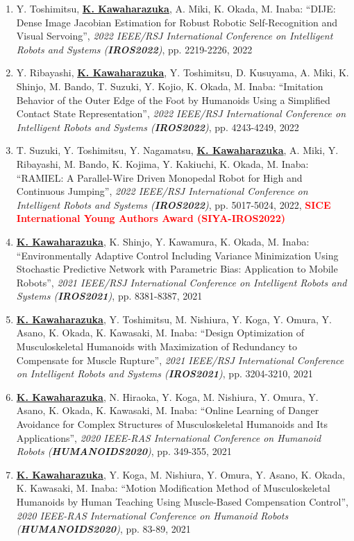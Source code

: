 \documentclass[letterpaper]{article}
\begin{document}
\begin{enumerate}
\item Y. Toshimitsu, \underline{\textbf{K. Kawaharazuka}}, A. Miki, K. Okada, M. Inaba: ``DIJE: Dense Image Jacobian Estimation for Robust Robotic Self-Recognition and Visual Servoing'', \textit{2022 IEEE/RSJ International Conference on Intelligent Robots and Systems (\textit{\textbf{IROS2022}})}, pp. 2219-2226, 2022
\item Y. Ribayashi, \underline{\textbf{K. Kawaharazuka}}, Y. Toshimitsu, D. Kusuyama, A. Miki, K. Shinjo, M. Bando, T. Suzuki, Y. Kojio, K. Okada, M. Inaba: ``Imitation Behavior of the Outer Edge of the Foot by Humanoids Using a Simplified Contact State Representation'', \textit{2022 IEEE/RSJ International Conference on Intelligent Robots and Systems (\textit{\textbf{IROS2022}})}, pp. 4243-4249, 2022
\item T. Suzuki, Y. Toshimitsu, Y. Nagamatsu, \underline{\textbf{K. Kawaharazuka}}, A. Miki, Y. Ribayashi, M. Bando, K. Kojima, Y. Kakiuchi, K. Okada, M. Inaba: ``RAMIEL: A Parallel-Wire Driven Monopedal Robot for High and Continuous Jumping'', \textit{2022 IEEE/RSJ International Conference on Intelligent Robots and Systems (\textit{\textbf{IROS2022}})}, pp. 5017-5024, 2022, \textbf{\textcolor{red}{SICE International Young Authors Award (SIYA-IROS2022)}}
\item \underline{\textbf{K. Kawaharazuka}}, K. Shinjo, Y. Kawamura, K. Okada, M. Inaba: ``Environmentally Adaptive Control Including Variance Minimization Using Stochastic Predictive Network with Parametric Bias: Application to Mobile Robots'', \textit{2021 IEEE/RSJ International Conference on Intelligent Robots and Systems (\textit{\textbf{IROS2021}})}, pp. 8381-8387, 2021
\item \underline{\textbf{K. Kawaharazuka}}, Y. Toshimitsu, M. Nishiura, Y. Koga, Y. Omura, Y. Asano, K. Okada, K. Kawasaki, M. Inaba: ``Design Optimization of Musculoskeletal Humanoids with Maximization of Redundancy to Compensate for Muscle Rupture'', \textit{2021 IEEE/RSJ International Conference on Intelligent Robots and Systems (\textit{\textbf{IROS2021}})}, pp. 3204-3210, 2021
\item \underline{\textbf{K. Kawaharazuka}}, N. Hiraoka, Y. Koga, M. Nishiura, Y. Omura, Y. Asano, K. Okada, K. Kawasaki, M. Inaba: ``Online Learning of Danger Avoidance for Complex Structures of Musculoskeletal Humanoids and Its Applications'', \textit{2020 IEEE-RAS International Conference on Humanoid Robots (\textit{\textbf{HUMANOIDS2020}})}, pp. 349-355, 2021
\item \underline{\textbf{K. Kawaharazuka}}, Y. Koga, M. Nishiura, Y. Omura, Y. Asano, K. Okada, K. Kawasaki, M. Inaba: ``Motion Modification Method of Musculoskeletal Humanoids by Human Teaching Using Muscle-Based Compensation Control'', \textit{2020 IEEE-RAS International Conference on Humanoid Robots (\textit{\textbf{HUMANOIDS2020}})}, pp. 83-89, 2021

\end{enumerate}
\end{document}
